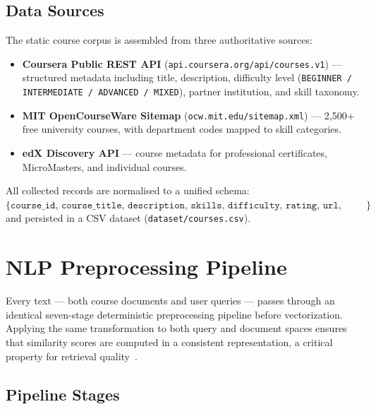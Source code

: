 \documentclass[12pt, a4paper]{article}
\begin{document}
\subsection{Data Sources}

The static course corpus is assembled from three authoritative sources:
\begin{itemize}[leftmargin=*]
    \item \textbf{Coursera Public REST API} (\texttt{api.coursera.org/api/courses.v1}) — structured
    metadata including title, description, difficulty level (\texttt{BEGINNER / INTERMEDIATE /
    ADVANCED / MIXED}), partner institution, and skill taxonomy.
    \item \textbf{MIT OpenCourseWare Sitemap} (\texttt{ocw.mit.edu/sitemap.xml}) — 2,500+ free
    university courses, with department codes mapped to skill categories.
    \item \textbf{edX Discovery API} — course metadata for professional certificates, MicroMasters,
    and individual courses.
\end{itemize}

All collected records are normalised to a unified schema:
$\{\texttt{course\_id, course\_title, description, skills, difficulty, rating, url, source}\}$
and persisted in a CSV dataset (\texttt{dataset/courses.csv}).

\section{NLP Preprocessing Pipeline}
\label{sec:nlp_pipeline}

Every text — both course documents and user queries — passes through an identical seven-stage
deterministic preprocessing pipeline before vectorization. Applying the same transformation to
both query and document spaces ensures that similarity scores are computed in a consistent
representation, a critical property for retrieval quality~\cite{manning2008introduction}.

\subsection{Pipeline Stages}
\end{document}
